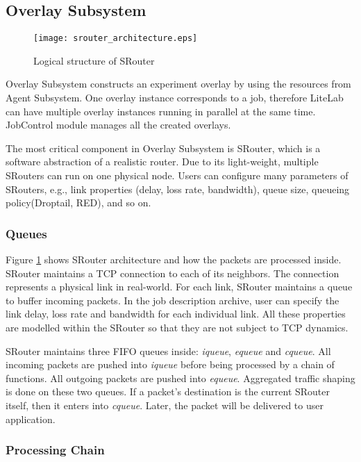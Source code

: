 \documentclass[conference]{IEEEtran}
\begin{document}
\subsection{Overlay Subsystem}
\label{sec:architecture:overlay}

\begin{figure}[!tb]
  \centering
  \texttt{[image: srouter\_architecture.eps]}
  \caption{Logical structure of SRouter}
  \label{sec:architecture:srouter_architecture}
  \vskip -5mm
\end{figure}

Overlay Subsystem constructs an experiment overlay by using the
resources from Agent Subsystem. One overlay instance corresponds to a
job, therefore LiteLab can have multiple overlay instances running in
parallel at the same time. JobControl module manages all the created
overlays.

The most critical component in Overlay Subsystem is SRouter, which is
a software abstraction of a realistic router. Due to its light-weight,
multiple SRouters can run on one physical node. Users can configure
many parameters of SRouters, e.g., link properties (delay, loss rate,
bandwidth), queue size, queueing policy(Droptail, RED), and so
on.

\subsubsection{Queues}
Figure \ref{sec:architecture:srouter_architecture} shows SRouter
architecture and how the packets are processed inside. SRouter
maintains a TCP connection to each of its neighbors. The connection
represents a physical link in real-world. For each link, SRouter
maintains a queue to buffer incoming packets. In the job description
archive, user can specify the link delay, loss rate and bandwidth for
each individual link. All these properties are modelled within the
SRouter so that they are not subject to TCP dynamics.

SRouter maintains three FIFO queues inside: \textit{iqueue},
\textit{equeue} and \textit{cqueue}. All incoming packets are pushed
into \textit{iqueue} before being processed by a chain of
functions. All outgoing packets are pushed into
\textit{equeue}. Aggregated traffic shaping is done on these two
queues.  If a packet's destination is the current SRouter itself, then
it enters into \textit{cqueue}.  Later, the packet will be delivered
to user application.

\subsubsection{Processing Chain}
\end{document}
